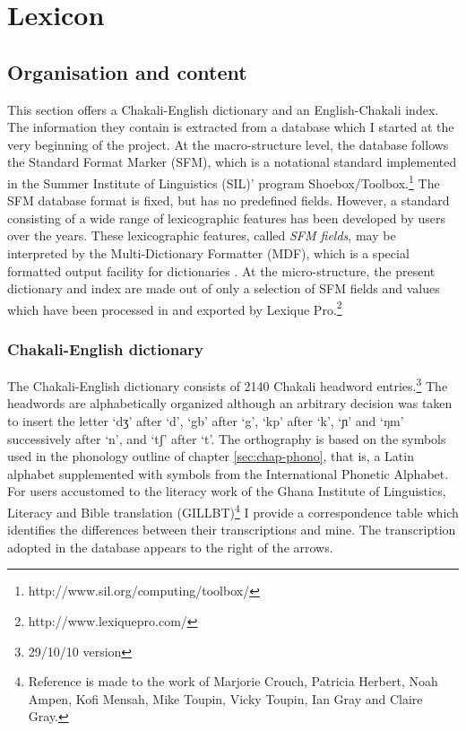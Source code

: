 \chapter{Lexicon}
\label{sec:LEX-lexicon}


% 
% 
% 



\section{Organisation and content}
\label{sec:LEX-Intro}
 
This section offers a Chakali-English dictionary and an English-Chakali index. 
The information they contain is extracted  from a database which I
started at the very beginning of the project.  At the  macro-structure level,
the database follows the Standard Format Marker (SFM),  which is a notational
standard implemented in the Summer Institute of Linguistics (SIL)' program
Shoebox/Toolbox.\footnote{http://www.sil.org/computing/toolbox/}   The SFM
database format is fixed, but has no predefined fields. However,  a  standard
consisting of a wide range of  lexicographic features has been developed by users 
over  the years. These lexicographic features, called {\it SFM fields}, 
may be interpreted by the Multi-Dictionary Formatter (MDF), which is a special
formatted output facility for dictionaries \citep[see][]{Cowa00}.  At the
micro-structure, the present dictionary and index are made out of  only a
selection of SFM fields and values which have been processed in and exported  
by 
Lexique
Pro.\footnote{http://www.lexiquepro.com/}    


\subsection{Chakali-English dictionary}

The Chakali-English dictionary consists of  2140 Chakali headword
entries.\footnote{29/10/10 version}  The headwords  are
alphabetically organized although an
arbitrary decision was taken to insert the letter `dʒ' after `d', `gb' after `g', `kp'
after `k',  `ɲ'  and `ŋm' successively after `n',  and `tʃ' after `t'.  
 The orthography is based on the  symbols used in the phonology outline of
chapter \ref{sec:chap-phono}, that is,  a Latin
alphabet supplemented with
symbols
from the International Phonetic Alphabet.  For  users accustomed to the literacy
work of
the Ghana Institute
of Linguistics, Literacy and Bible translation (GILLBT)\footnote{Reference is
made to the work of Marjorie Crouch\dag, Patricia Herbert, Noah Ampen, Kofi
Mensah, Mike Toupin, Vicky Toupin, Ian Gray and Claire Gray.} I provide a
correspondence table which identifies the differences between their
transcriptions and mine. The transcription adopted in the database  appears to
the right of the arrows. 

